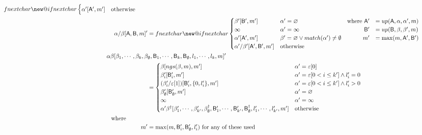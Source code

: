 \documentclass[submission,copyright,creativecommons]{eptcs}
\makeatletter
\newcommand{\g}[1]{\mathsf{#1}}
\newcommand{\upd}{up}
\newcommand{\ngs}{ngs}
\newcommand{\genseq}{\alpha\beta[\beta_1,\cdots,\beta_k,\beta_\emptyset,\g{B}_1,\cdots,\g{B}_k,\g{B}_\emptyset,l_1,\cdots,l_k,m]}
\newenvironment{mcases}[1][l]
 {\let\@ifnextchar\new@ifnextchar
  \left\lbrace
  \def\arraystretch{1.2}\array{@{}l@{\quad}#1@{}}}
 {\endarray\right.}
\makeatother
\begin{document}
\begin{table*}
\begin{subfigure}[t]{\textwidth}
\begin{align*}
\begin{mcases}[lrl]
                                                     \alpha'[\g{A}',m']              & \text{otherwise} & & \end{mcases} \\
\alpha/\beta[\g{A},\g{B},m]' & = \begin{mcases}[lrl] \beta'[\g{B}',m']  & \alpha' = \varnothing                                     & \text{where}~\g{A}' & = \upd(\g{A},\alpha,\alpha',m) \\
                                                     \infty             & \alpha' = \infty                                          &              \g{B}' & = \upd(\g{B},\beta,\beta',m) \\
                                                     \alpha'[\g{A}',m'] & \beta' = \varnothing \lor match(\alpha') \neq \emptyset   &                  m' & = \max(m,\g{A}',\g{B}') \\
                                                     \alpha'/\beta'[\g{A}',\g{B}',m'] & \text{otherwise} & & \end{mcases} \\
\mathrlap{\genseq'}~~~~~~~~~~~~~~~~~~~~~ \\
& = \begin{cases} \beta[\ngs(\beta,m),m']                        & \alpha' = \varepsilon[0] \\
                  \beta_i'[\g{B}_i',m']                             & \alpha' = \varepsilon[0 < i \leq k'] \land l_i' = 0 \\
                  (\beta_i'/\varepsilon[1])[\g{B}_i',\{0,l_i'\},m'] & \alpha' = \varepsilon[0 < i \leq k'] \land l_i' > 0 \\
                  \beta_\emptyset'[\g{B}_\emptyset',m']             & \alpha' = \varnothing \\
                  \infty                                            & \alpha' = \infty \\
                  \alpha'\beta^\dagger[\beta_1',\cdots,\beta_{k'}',\beta_\emptyset^\dagger,\g{B}_1',\cdots,\g{B}_{k'}',\g{B}_\emptyset^\dagger,l_1',\cdots,l_{k'}',m'] & \text{otherwise} \end{cases} \\
\text{where~~~~~~~~~~~} & \\
m'                              & = \max(m,\g{B}_i',\g{B}_\emptyset',l_i') \text{ for any of these used}
\end{align*}
\end{subfigure}
\begin{subfigure}[t]{\textwidth}

\end{subfigure}
\end{table*}
\end{document}
